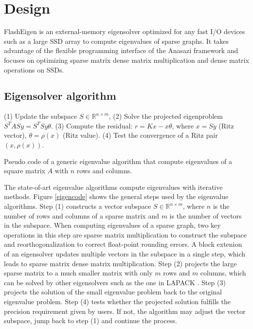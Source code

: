 \section{Design}
FlashEigen is an external-memory eigensolver optimized for any fast I/O devices
such as a large SSD array to compute eigenvalues of sparse graphs. It takes
advantage of the flexible programming interface of the Anasazi framework and
focuses on optimizing sparse matrix dense matrix multiplication and dense
matrix operations on SSDs.

\subsection{Eigensolver algorithm}


\begin{algorithm}
	\begin{algorithmic}[1]
		\State (1) Update the subspace $S \in \mathbb{R}^{n \times m}$,
		\State (2) Solve the projected eigenproblem $S^TASy = S^TSy\theta$.
		\State (3) Compute the residual: $r = Kx - x\theta$, where
		\State\hspace{\algorithmicindent} $x = Sy$ (Ritz vector), $\theta = \rho(x)$ (Ritz value).
		\State (4) Test the convergence of a Ritz pair $(x, \rho(x))$.
		\EndFor
	\end{algorithmic}
	\caption{Pseudo code of a generic eigenvalue algorithm that compute eigenvalues
	of a square matrix $A$ with $n$ rows and columns.}
	\label{eigencode}
\end{algorithm}

The state-of-art eigenvalue algorithms compute eigenvalues with iterative
methods. Figure \ref{eigencode} shows the general steps used by the eigenvalue
algorithms.
Step (1) constructs a vector subspace $S \in \mathbb{R}^{n \times m}$, where
$n$ is the number of rows and columns of a sparse matrix and $m$ is the number
of vectors in the subspace. When computing eigenvalues of a sparse graph,
two key operations in this step are sparse matrix multiplication to construct
the subspace and reorthogonalization to correct float-point rounding errors.
A block extenion of an eigensolver updates multiple vectors in the subspace
in a single step, which leads to sparse matrix dense matrix multiplication.
Step (2) projects the large sparse matrix to a much smaller matrix with only
$m$ rows and $m$ columns, which can be solved by other eigensolvers such as
the one in LAPACK \cite{lapack}. Step (3) projects the solution of the small
eigenvalue problem back to the original eigenvalue problem. Step (4) tests
whether the projected solution fulfills the precision requirement given by
users. If not, the algorithm may adjust the vector subspace, jump back to
step (1) and continue the process.

